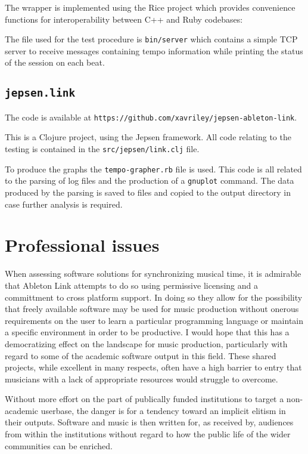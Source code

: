 \documentclass[11pt]{article} %
\theoremstyle{plain}
\theoremstyle{definition}
\begin{document}
The wrapper is implemented using the Rice project which provides convenience
functions for interoperability between C++ and Ruby codebases:
\texttt{}

The file used for the test procedure is \texttt{bin/server} which contains a
simple TCP server to receive messages containing tempo information while
printing the status of the session on each beat.

\subsection{\texttt{jepsen.link}}

The code is available at
\texttt{https://github.com/xavriley/jepsen-ableton-link}.

This is a Clojure project, using the Jepsen framework. All code relating to the
testing is contained in the \texttt{src/jepsen/link.clj} file.

To produce the graphs the \texttt{tempo-grapher.rb} file is used. This code is
all related to the parsing of log files and the production of a
\texttt{gnuplot} command. The data produced by the parsing is saved to files
and copied to the output directory in case further analysis is required.

\section{Professional issues}

When assessing software solutions for synchronizing musical time, it is
admirable that Ableton Link attempts to do so using permissive licensing and a
committment to cross platform support. In doing so they allow for the
possibility that freely available software may be used for music production
without onerous requirements on the user to learn a particular programming
language or maintain a specific environment in order to be productive. I would
hope that this has a democratizing effect on the landscape for music
production, particularly with regard to some of the academic software output in
this field. These shared projects, while excellent in many respects, often have
a high barrier to entry that musicians with a lack of appropriate resources
would struggle to overcome.

Without more effort on the part of publically funded institutions to target a
non-academic userbase, the danger is for a tendency toward an implicit elitism
in their outputs. Software and music is then written for, as received by,
audiences from within the institutions without regard to how the public life of
the wider communities can be enriched.
\end{document}
